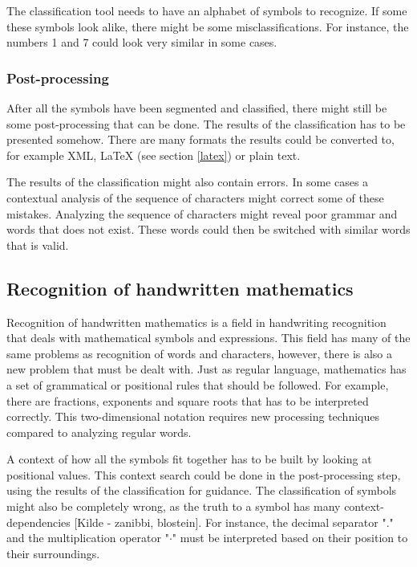 The classification tool needs to have an alphabet of symbols to recognize. If some these symbols look alike, there might be some misclassifications. For instance, the numbers 1 and 7 could look very similar in some cases.

\subsubsection{Post-processing}
After all the symbols have been segmented and classified, there might still be some post-processing that can be done. The results of the classification has to be presented somehow. There are many formats the results could be converted to, for example XML, LaTeX (see section \ref{latex}) or plain text.

The results of the classification might also contain errors. In some cases a contextual analysis of the sequence of characters might correct some of these mistakes. Analyzing the sequence of characters might reveal poor grammar and words that does not exist. These words could then be switched with similar words that is valid.

\subsection{Recognition of handwritten mathematics} 
\label{recognition of handwritten mathematics}
Recognition of handwritten mathematics is a field in handwriting recognition that deals with mathematical symbols and expressions. This field has many of the same problems as recognition of words and characters, however, there is also a new problem that must be dealt with. Just as regular language, mathematics has a set of grammatical or positional rules that should be followed. For example, there are fractions, exponents and square roots that has to be interpreted correctly. This two-dimensional notation requires new processing techniques compared to analyzing regular words.

A context of how all the symbols fit together has to be built by looking at positional values. This context search could be done in the post-processing step, using the results of the classification for guidance. The classification of symbols might also be completely wrong, as the truth to a symbol has many context-dependencies [Kilde - zanibbi, blostein]. For instance, the decimal separator "." and the multiplication operator "$\cdot$" must be interpreted based on their position to their surroundings.

